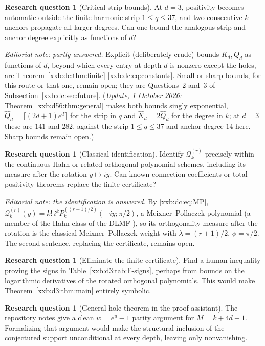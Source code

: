 \documentclass[11pt,a4paper]{article}
\numberwithin{equation}{section}
\theoremstyle{definition}
\newtheorem{question}[theorem]{Research question}
\theoremstyle{remark}
\theoremstyle{plain}
\begin{document}
\begin{question}[Critical-strip bounds]
At $d=3$, positivity becomes automatic outside the finite harmonic strip
$1\leq q\leq37$, and two consecutive $k$-anchors propagate all larger degrees.
Can one bound the analogous strip and anchor degree explicitly as functions of
$d$?
\end{question}

\emph{Editorial note: partly answered.}  Explicit (deliberately crude) bounds
$K_d,Q_d$ as functions of $d$, beyond which every entry at depth $d$ is
nonzero except the holes, are Theorem~\ref{xxb:dc:thm:finite}
\eqref{xxb:dc:eq:constants}.  Small or sharp bounds, for this route or that
one, remain open; they are Questions~2 and~3 of
Subsection~\ref{xxb:dc:sec:future}.  (\emph{Update, 1 October 2026:}
Theorem~\ref{xxb:d56:thm:general} makes both bounds singly exponential,
$\widehat Q_d=\lceil(2d+1)e^d\rceil$ for the strip in $q$ and
$\widehat K_d=2\widehat Q_d$ for the degree in $k$; at $d=3$ these are $141$
and $282$, against the strip $1\le q\le37$ and anchor degree $14$ here.  Sharp
bounds remain open.)

\begin{question}[Classical identification]
Identify $\mathcal Q_k^{(r)}$ precisely within the continuous Hahn or related
orthogonal-polynomial schemes, including its measure after the rotation
$y\mapsto iy$.  Can known connection coefficients or total-positivity theorems
replace the finite certificate?
\end{question}

\emph{Editorial note: the identification is answered.}  By
\eqref{xxb:dc:eq:MP}, $\mathcal Q_k^{(r)}(y)=k!\,i^kP_k^{((r+1)/2)}(-iy;\pi/2)$,
a Meixner--Pollaczek polynomial (a member of the Hahn class of the DLMF
\cite{xxbdc-dlmf}), so its orthogonality measure after the rotation is the
classical Meixner--Pollaczek weight with $\lambda=(r+1)/2$, $\phi=\pi/2$.  The
second sentence, replacing the certificate, remains open.

\begin{question}[Eliminate the finite certificate]
Find a human inequality proving the signs in Table~\ref{xxb:d3:tab:F-signs},
perhaps from bounds on the logarithmic derivatives of the rotated orthogonal
polynomials.  This would make Theorem~\ref{xxb:d3:thm:main} entirely symbolic.
\end{question}

\begin{question}[General hole theorem in the proof assistant]
The repository notes give a clean $w=e^u-1$ parity argument for
$M=k+4d+1$.  Formalizing that argument would make the structural inclusion of
the conjectured support unconditional at every depth, leaving only
nonvanishing.
\end{question}
\end{document}

